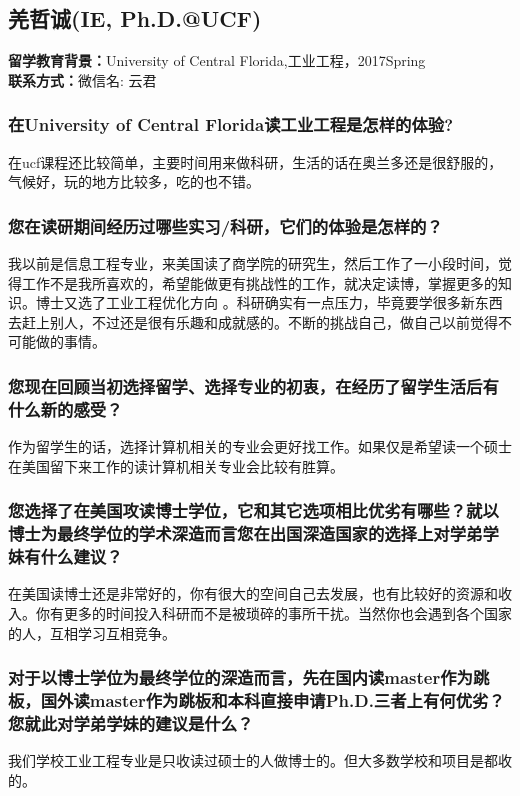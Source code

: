 \documentclass[a4paper,UTF8]{book}
\begin{document}
\clearpage
\subsection{羌哲诚(IE, Ph.D.@UCF)}
    \textbf{留学教育背景：}University of Central Florida,工业工程，2017Spring\\
    \textbf{联系方式：}微信名: 云君

    \subsubsection*{在University of Central Florida读工业工程是怎样的体验?}
    在ucf课程还比较简单，主要时间用来做科研，生活的话在奥兰多还是很舒服的，气候好，玩的地方比较多，吃的也不错。

    \subsubsection*{您在读研期间经历过哪些实习/科研，它们的体验是怎样的？}
    我以前是信息工程专业，来美国读了商学院的研究生，然后工作了一小段时间，觉得工作不是我所喜欢的，希望能做更有挑战性的工作，就决定读博，掌握更多的知识。博士又选了工业工程优化方向 。科研确实有一点压力，毕竟要学很多新东西去赶上别人，不过还是很有乐趣和成就感的。不断的挑战自己，做自己以前觉得不可能做的事情。

    \subsubsection*{您现在回顾当初选择留学、选择专业的初衷，在经历了留学生活后有什么新的感受？}
    作为留学生的话，选择计算机相关的专业会更好找工作。如果仅是希望读一个硕士在美国留下来工作的读计算机相关专业会比较有胜算。

    \subsubsection*{您选择了在美国攻读博士学位，它和其它选项相比优劣有哪些？就以博士为最终学位的学术深造而言您在出国深造国家的选择上对学弟学妹有什么建议？}
    在美国读博士还是非常好的，你有很大的空间自己去发展，也有比较好的资源和收入。你有更多的时间投入科研而不是被琐碎的事所干扰。当然你也会遇到各个国家的人，互相学习互相竞争。 

    \subsubsection*{对于以博士学位为最终学位的深造而言，先在国内读master作为跳板，国外读master作为跳板和本科直接申请Ph.D.三者上有何优劣？您就此对学弟学妹的建议是什么？}
    我们学校工业工程专业是只收读过硕士的人做博士的。但大多数学校和项目是都收的。
\end{document}
